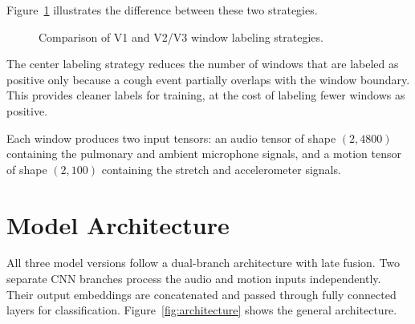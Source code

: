 Figure~\ref{fig:windowing} illustrates the difference between these two strategies.

\begin{figure}[H]
\centering
{}
\caption{Comparison of V1 and V2/V3 window labeling strategies.}
\label{fig:windowing}
\end{figure}

The center labeling strategy reduces the number of windows that are labeled as positive only because a cough event partially overlaps with the window boundary. This provides cleaner labels for training, at the cost of labeling fewer windows as positive.

Each window produces two input tensors: an audio tensor of shape $(2, 4800)$ containing the pulmonary and ambient microphone signals, and a motion tensor of shape $(2, 100)$ containing the stretch and accelerometer signals.

\section{Model Architecture}

All three model versions follow a dual-branch architecture with late fusion. Two separate CNN branches process the audio and motion inputs independently. Their output embeddings are concatenated and passed through fully connected layers for classification. Figure~\ref{fig:architecture} shows the general architecture.

